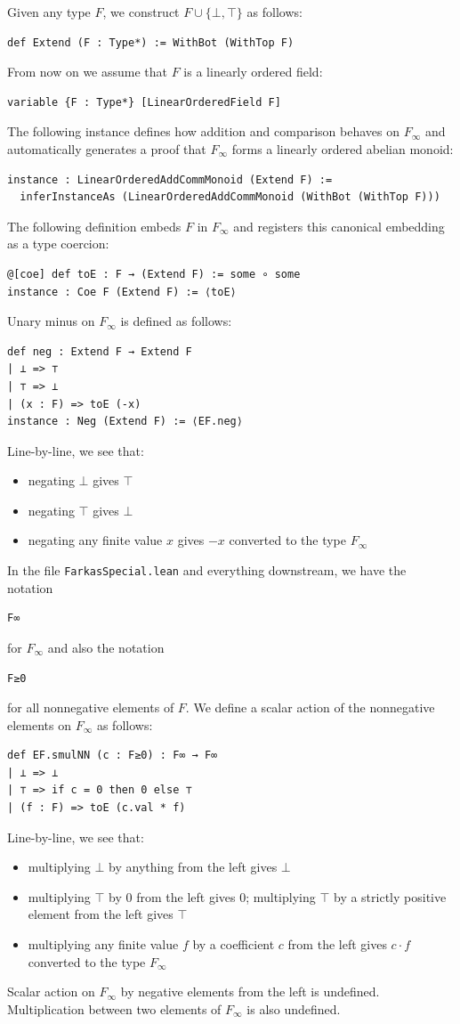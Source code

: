 \documentclass[]{article}
\renewcommand{\.}{\hskip .75pt}
\let\*=\cdot
\begin{document}
Given any type $F$, we construct $F \cup \{ \bot, \top \}$ as follows:
\begin{lstlisting}
def Extend (F : Type*) := WithBot (WithTop F)
\end{lstlisting}
From now on we assume that $F$ is a linearly ordered field:
\begin{lstlisting}
variable {F : Type*} [LinearOrderedField F]
\end{lstlisting}
The following instance defines how addition and comparison
behaves on $F_\infty$ and automatically generates a proof
that $F_\infty$ forms a linearly ordered abelian monoid:
\begin{lstlisting}
instance : LinearOrderedAddCommMonoid (Extend F) :=
  inferInstanceAs (LinearOrderedAddCommMonoid (WithBot (WithTop F)))
\end{lstlisting}
The following definition embeds $F$ in $F_\infty$ and registers
this canonical embedding as a type coercion:
\begin{lstlisting}
@[coe] def toE : F → (Extend F) := some ∘ some
instance : Coe F (Extend F) := ⟨toE⟩
\end{lstlisting}
Unary minus on $F_\infty$ is defined as follows:
\begin{lstlisting}
def neg : Extend F → Extend F
| ⊥ => ⊤
| ⊤ => ⊥
| (x : F) => toE (-x)
instance : Neg (Extend F) := ⟨EF.neg⟩
\end{lstlisting}
Line-by-line, we see that:
\begin{itemize}
\item negating $\bot$ gives $\top$
\item negating $\top$ gives $\bot$
\item negating any finite value $x$ gives $-x$ converted to the type $F_\infty$
\end{itemize}
In the file \texttt{FarkasSpecial.lean} and everything downstream,
we have the notation
\begin{lstlisting}
F∞
\end{lstlisting}
for $F_\infty$ and also the notation
\begin{lstlisting}
F≥0
\end{lstlisting}
for all nonnegative elements of $F$.
We define a scalar action of the nonnegative elements
on $F_\infty$ as follows:
\begin{lstlisting}
def EF.smulNN (c : F≥0) : F∞ → F∞
| ⊥ => ⊥
| ⊤ => if c = 0 then 0 else ⊤
| (f : F) => toE (c.val * f)
\end{lstlisting}
Line-by-line, we see that:
\begin{itemize}
\item multiplying $\bot$ by anything from the left gives $\bot$
\item multiplying $\top$ by $0$ from the left gives $0$;
multiplying $\top$ by a strictly positive element from the left gives $\top$
\item multiplying any finite value $f$ by a coefficient $c$ from the left
gives $c \* f$ converted to the type $F_\infty$
\end{itemize}
Scalar action on $F_\infty$ by negative elements from the left is undefined.
Multiplication between two elements of $F_\infty$ is also undefined.
\end{document}
